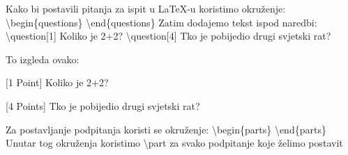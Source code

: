 \documentclass[addpoints,answers]{beamer}
\newcounter{points}
\newenvironment{questions}{\setcounter{points}{0}}{}
\newcommand{\question}[1][1]{\addtocounter{points}{#1}}
\begin{document}
\begin{frame}
Kako bi postavili pitanja za ispit u LaTeX-u koristimo okruženje:
\newline
\newline
\color{blue}
\textbackslash{begin\{questions\}}
\color{black}
\color{blue}
\newline
\newline
\textbackslash{end\{questions\}}
\color{black}
\newline
\newline
Zatim dodajemo tekst ispod naredbi:
\newline
\newline
\color{blue}
\textbackslash{question[1]}
\color{black}
\newline
Koliko je 2+2?
\newline
\newline
\color{blue}
\textbackslash{question[4]}
\color{black}
\newline
Tko je pobijedio drugi svjetski rat?

\end{frame}


\begin{frame}
\begin{questions}
	
To izgleda ovako:
\newline
\newline
\question[1]
[1 Point] Koliko je 2+2?
\newline
\newline
\question[4]
[4 Points] Tko je pobijedio drugi svjetski rat?
\end{questions}
\end{frame}




\begin{frame}
Za postavljanje podpitanja koristi se okruženje:
\newline
\newline
\color{blue}
\textbackslash{begin\{parts\}}
\color{black}
\newline
\newline
\color{blue}
\textbackslash{end\{parts\}}
\color{black}
\newline
\newline
Unutar tog okruženja koristimo
\newline
\newline
\color{blue}
\textbackslash{part}
\color{black}
\newline
\newline
za svako podpitanje koje želimo postavit
\end{frame}
\end{document}
